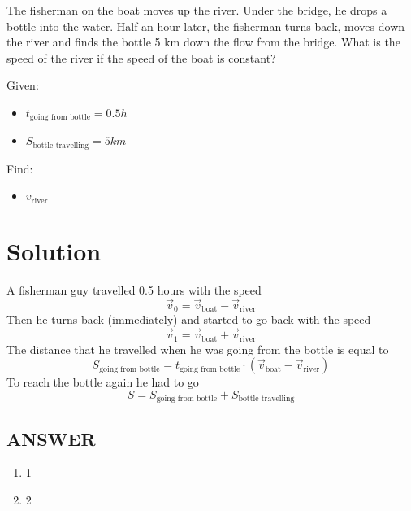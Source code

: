 The fisherman on the boat moves up the river. Under the bridge, he drops a bottle into the water.
Half an hour later, the fisherman turns back, moves down the river and finds the bottle 5 km
down the flow from the bridge. What is the speed of the river if the speed of the boat is constant?

\bigbreak Given: \begin{itemize}
    \item $t_{\text{going from bottle}} = 0.5h$
    \item $S_{\text{bottle travelling}} = 5km$
\end{itemize}

Find: \begin{itemize}
    \item $v_{\text{river}}$
\end{itemize}

\section*{Solution}

A fisherman guy travelled 0.5 hours with the speed $$\Vec{v}_0 = \Vec{v}_{\text{boat}} - \Vec{v}_{\text{river}}$$
Then he turns back (immediately) and started to go back with the speed $$\Vec{v}_1 = \Vec{v}_{\text{boat}} + \Vec{v}_{\text{river}}$$
The distance that he travelled when he was going from the bottle is equal to $$S_{\text{going from bottle}} = t_{\text{going from bottle}} \cdot (\Vec{v}_{\text{boat}} - \Vec{v}_{\text{river}})$$
To reach the bottle again he had to go
$$S = S_{\text{going from bottle}} + S_{\text{bottle travelling}}$$


\vfill
\subsection*{ANSWER}
\begin{enumerate}
    \item 1
    \item 2
\end{enumerate}

